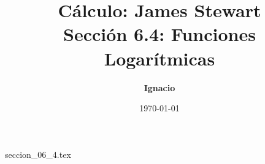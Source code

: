 \documentclass[11pt,spanish,oneside]{report}
\title{\textbf{Cálculo: James Stewart} \\ \Large Sección 6.4: Funciones Logarítmicas}
\author{\textbf{Ignacio}}
\date{\today}
\begin{document}
\maketitle

{seccion_06_4.tex}
\end{document}
